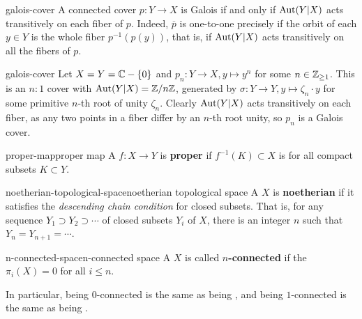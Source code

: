 \begin{example}{galois-cover}
    A connected cover $p \colon Y \to X$ is Galois if and only if $\textup{Aut}(Y|X)$ acts transitively on each fiber of $p$. Indeed, $\overline{p}$ is one-to-one precisely if the orbit of each $y \in Y$ is the whole fiber $p^{-1}(p(y))$, that is, if $\textup{Aut}(Y|X)$ acts transitively on all the fibers of $p$.
\end{example}

\begin{example}{galois-cover}
    Let $X = Y = \mathbb{C} - \{ 0 \}$ and $p_n \colon Y \to X, y \mapsto y^n$ for some $n \in \mathbb{Z}_{\ge 1}$. This is an $n : 1$ cover with $\textup{Aut}(Y|X) = \mathbb{Z}/n\mathbb{Z}$, generated by $\sigma \colon Y \to Y, y \mapsto \zeta_n \cdot y$ for some primitive $n$-th root of unity $\zeta_n$. Clearly $\textup{Aut}(Y|X)$ acts transitively on each fiber, as any two points in a fiber differ by an $n$-th root unity, so $p_n$ is a Galois cover.
\end{example}

\begin{topic}{proper-map}{proper map}
    A  $f \colon X \to Y$ is \textbf{proper} if $f^{-1}(K) \subset X$ is  for all compact subsets $K \subset Y$.
\end{topic}

\begin{topic}{noetherian-topological-space}{noetherian topological space}
    A  $X$ is \textbf{noetherian} if it satisfies the \textit{descending chain condition} for closed subsets. That is, for any sequence $Y_1 \supset Y_2 \supset \cdots$ of closed subsets $Y_i$ of $X$, there is an integer $n$ such that $Y_n = Y_{n + 1} = \cdots$.
\end{topic}

\begin{topic}{n-connected-space}{n-connected space}
    A  $X$ is called \textbf{$n$-connected} if the  $\pi_i(X) = 0$ for all $i \le n$.
    
    In particular, being $0$-connected is the same as being , and being $1$-connected is the same as being .
\end{topic}

